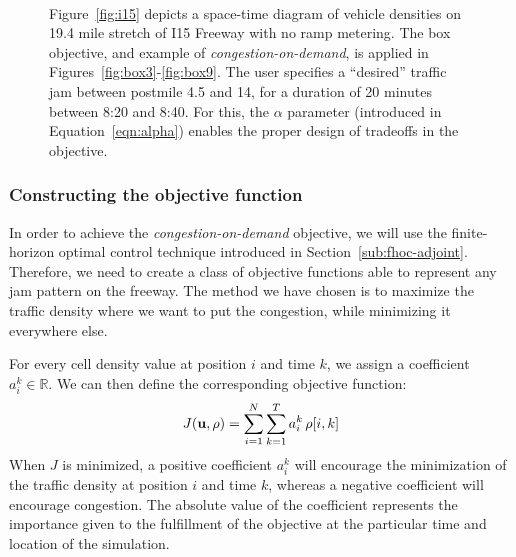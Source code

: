\begin{figure}
\centering
{}\\
\hfill
{}\hfill
{}%
\caption[I15 South box objective attack with multiple trade-off parameter values.]{Figure~\ref{fig:i15} depicts a space-time diagram of vehicle densities on 19.4 mile stretch of I15 Freeway with no ramp metering. The box objective, and example of \emph{congestion-on-demand}, is applied in Figures~\ref{fig:box3}-\ref{fig:box9}. The user specifies a ``desired'' traffic jam between postmile 4.5 and 14, for a duration of 20 minutes between 8:20 and 8:40. For this, the $\alpha$ parameter (introduced in Equation~\eqref{eqn:alpha}) enables the proper design of tradeoffs in the objective.}
\end{figure}

\subsubsection{Constructing the objective function}
In order to achieve the \emph{congestion-on-demand} objective, we will use the finite-horizon optimal control technique introduced in Section~\ref{sub:fhoc-adjoint}. Therefore, we need to create a class of objective functions able to represent any jam pattern on the freeway. The method we have chosen is to maximize the traffic density where we want to put the congestion, while minimizing it everywhere else.

For every cell density value at position $i$ and time $k$, we assign a coefficient $a_i^k \in \mathbb{R}$. We can then define the corresponding objective function:
\begin{equation}
\label{eqn:jamondemand}
J \left( \vectorize{u}, \vectorize{\rho} \right) = \sum_{i = 1}^{N} \sum_{k = 1}^{T} a_i^k \, \rho\left[i,k\right]
\end{equation}
When $J$ is minimized, a positive coefficient $a_i^k$ will encourage the minimization of the traffic density at position $i$ and time $k$, whereas a negative coefficient will encourage congestion. The absolute value of the coefficient represents the importance given to the fulfillment of the objective at the particular time and location of the simulation.

